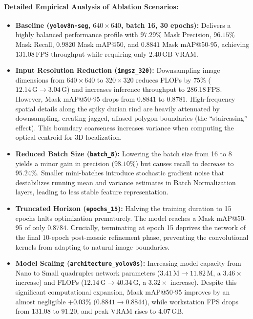 \documentclass[12pt,a4paper]{article}
\begin{document}
\paragraph{Detailed Empirical Analysis of Ablation Scenarios:}
\begin{itemize}
    \item \textbf{Baseline (\texttt{yolov8n-seg}, $640\times 640$, batch 16, 30 epochs):} Delivers a highly balanced performance profile with $97.29\%$ Mask Precision, $96.15\%$ Mask Recall, $0.9820$ Mask mAP@50, and $0.8841$ Mask mAP@50-95, achieving $131.08\,\text{FPS}$ throughput while requiring only $2.40\,\text{GB}$ VRAM.
    
    \item \textbf{Input Resolution Reduction (\texttt{imgsz\_320}):} Downsampling image dimensions from $640 \times 640$ to $320 \times 320$ reduces FLOPs by $75\%$ ($12.14\,\text{G} \rightarrow 3.04\,\text{G}$) and increases inference throughput to $286.18\,\text{FPS}$. However, Mask mAP@50-95 drops from $0.8841$ to $0.8781$. High-frequency spatial details along the spiky durian rind are heavily attenuated by downsampling, creating jagged, aliased polygon boundaries (the ``staircasing'' effect). This boundary coarseness increases variance when computing the optical centroid for 3D localization.
    
    \item \textbf{Reduced Batch Size (\texttt{batch\_8}):} Lowering the batch size from 16 to 8 yields a minor gain in precision ($98.10\%$) but causes recall to decrease to $95.24\%$. Smaller mini-batches introduce stochastic gradient noise that destabilizes running mean and variance estimates in Batch Normalization layers, leading to less stable feature representation.
    
    \item \textbf{Truncated Horizon (\texttt{epochs\_15}):} Halving the training duration to 15 epochs halts optimization prematurely. The model reaches a Mask mAP@50-95 of only $0.8784$. Crucially, terminating at epoch 15 deprives the network of the final 10-epoch post-mosaic refinement phase, preventing the convolutional kernels from adapting to natural image boundaries.
    
    \item \textbf{Model Scaling (\texttt{architecture\_yolov8s}):} Increasing model capacity from Nano to Small quadruples network parameters ($3.41\,\text{M} \rightarrow 11.82\,\text{M}$, a $3.46\times$ increase) and FLOPs ($12.14\,\text{G} \rightarrow 40.34\,\text{G}$, a $3.32\times$ increase). Despite this significant computational expansion, Mask mAP@50-95 improves by an almost negligible $+0.03\%$ ($0.8841 \rightarrow 0.8844$), while workstation FPS drops from $131.08$ to $91.20$, and peak VRAM rises to $4.07\,\text{GB}$.
\end{itemize}
\end{document}
